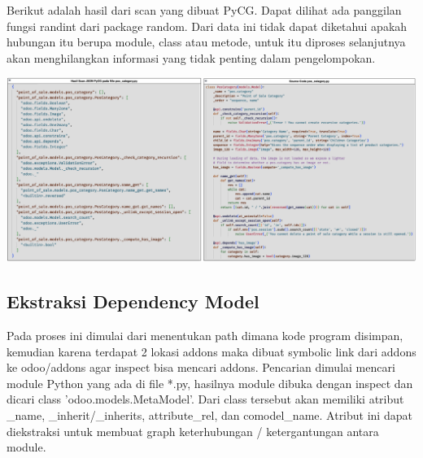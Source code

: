 Berikut adalah hasil dari scan yang dibuat PyCG. Dapat dilihat ada panggilan fungsi randint dari package random. Dari data ini tidak dapat diketahui apakah hubungan itu berupa module, class atau metode, untuk itu diproses selanjutnya akan menghilangkan informasi yang tidak penting dalam pengelompokan.

\begin{center}
	\includegraphics[width=14cm]{img/bab_4/hasil_scan_pycg.png}
	\label{fig:hasil_scan_pycg}
\end{center}

\subsection{Ekstraksi Dependency Model}
Pada proses ini dimulai dari menentukan path dimana kode program disimpan, kemudian karena terdapat 2 lokasi addons maka dibuat symbolic link dari addons ke odoo/addons agar inspect bisa mencari addons. Pencarian dimulai mencari module Python yang ada di file *.py, hasilnya module dibuka dengan inspect dan dicari class 'odoo.models.MetaModel'. Dari class tersebut akan memiliki atribut {\_}name, {\_}inherit/{\_}inherits, attribute{\_}rel, dan comodel{\_}name. Atribut ini dapat diekstraksi untuk membuat graph keterhubungan / ketergantungan antara module.

